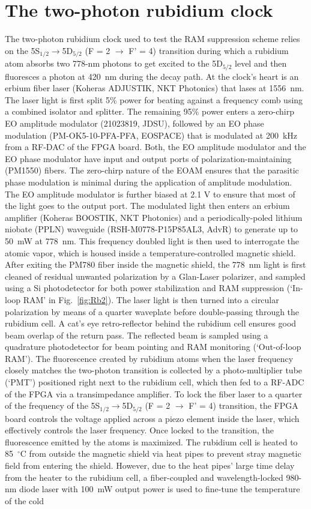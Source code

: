 \documentclass[aip,graphicx]{revtex4-2}
\begin{document}
	\section{The two-photon rubidium clock}
	The two-photon rubidium clock used to test the RAM suppression scheme relies on the 5S$_{1/2}\rightarrow$5D$_{5/2}$ (F = 2 $\rightarrow$ F' = 4) transition during which a rubidium atom absorbs two 778-nm photons to get excited to the 5D$_{5/2}$ level and then fluoresces a photon at 420~nm during the decay path. At the clock’s heart is an erbium fiber laser (Koheras ADJUSTIK, NKT Photonics) that lases at 1556~nm. The laser light is first split 5\% power for beating against a frequency comb using a combined isolator and splitter. The remaining 95\% power enters a zero-chirp EO amplitude modulator (21023819, JDSU), followed by an EO phase modulation (PM-OK5-10-PFA-PFA, EOSPACE) that is modulated at 200~kHz from a RF-DAC of the FPGA board. Both, the  EO amplitude modulator and the EO phase modulator have input and output ports of polarization-maintaining (PM1550) fibers. The zero-chirp nature of the EOAM ensures that the parasitic phase modulation is minimal during the application of amplitude modulation. The EO amplitude modulator is further biased at 2.1 V to ensure that most of the light goes to the output port. The modulated light then enters an erbium amplifier (Koheras BOOSTIK, NKT Photonics) and a periodically-poled lithium niobate (PPLN) waveguide (RSH-M0778-P15P85AL3, AdvR) to generate up to 50~mW at 778~nm. This frequency doubled light is then used to interrogate the atomic vapor, which is housed inside a temperature-controlled magnetic shield. After exiting the PM780 fiber inside the magnetic shield, the 778~nm light is first cleaned of residual unwanted polarization by a Glan-Laser polarizer, and sampled using a Si photodetector for both power stabilization and RAM suppression (`In-loop RAM' in Fig.~\ref{fig:Rb2}). The laser light is then turned into a circular polarization by means of a quarter waveplate before double-passing through the rubidium cell. A cat’s eye retro-reflector behind the rubidium cell ensures good beam overlap of the return pass. The reflected beam is sampled using a quadrature photodetector for beam pointing and RAM monitoring (`Out-of-loop RAM'). The fluorescence created by rubidium atoms when the laser frequency closely matches the two-photon transition is collected by a photo-multiplier tube (`PMT') positioned right next to the rubidium cell, which then fed to a RF-ADC of the FPGA via a transimpedance amplifier. To lock the fiber laser to a quarter of the frequency of the 5S$_{1/2}\rightarrow$5D$_{5/2}$ (F = 2 $\rightarrow$ F' = 4) transition, the FPGA board controls the voltage applied across a piezo element inside the laser, which effectively controls the laser frequency.  Once locked to the transition, the fluorescence emitted by the atoms is maximized. The rubidium cell is heated to 85~$^{\circ}$C from outside the magnetic shield via heat pipes to prevent stray magnetic field from entering the shield. However, due to the heat pipes’ large time delay from the heater to the rubidium cell, a fiber-coupled and wavelength-locked 980-nm diode laser with 100~mW output power is used to fine-tune the temperature of the cold 
\end{document}
